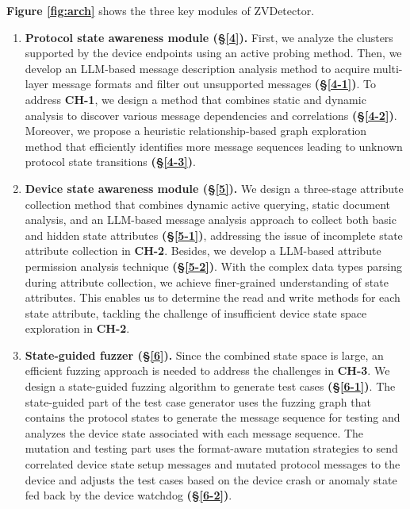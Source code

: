\documentclass[10pt,journal,compsoc]{IEEEtran}
\begin{document}
\textbf{Figure \ref{fig:arch}} shows the three key modules of ZVDetector. \vspace{0cm}
\begin{enumerate}[$\bullet$]
    \setlength{\itemsep}{3pt}
    \setlength{\topsep}{1pt}
    \item \textbf{Protocol state awareness module (\S\ref{4}).} First, we analyze the clusters supported by the device endpoints using an active probing method. Then, we develop an LLM-based message description analysis method to acquire multi-layer message formats and filter out unsupported messages \textbf{(\S\ref{4-1})}. To address \textbf{CH-1}, we design a method that combines static and dynamic analysis to discover various message dependencies and correlations \textbf{(\S\ref{4-2})}. Moreover, we propose a heuristic relationship-based graph exploration method that efficiently identifies more message sequences leading to unknown protocol state transitions \textbf{(\S\ref{4-3})}.
    
    \item \textbf{Device state awareness module (\S\ref{5}).} We design a three-stage attribute collection method that combines dynamic active querying, static document analysis, and an LLM-based message analysis approach to collect both basic and hidden state attributes \textbf{(\S\ref{5-1})}, addressing the issue of incomplete state attribute collection in \textbf{CH-2}. Besides, we develop a LLM-based attribute permission analysis technique \textbf{(\S\ref{5-2})}. With the complex data types parsing during attribute collection, we achieve finer-grained understanding of state attributes. This enables us to determine the read and write methods for each state attribute, tackling the challenge of insufficient device state space exploration in \textbf{CH-2}.

    \item \textbf{State-guided fuzzer (\S\ref{6}).} Since the combined state space is large, an efficient fuzzing approach is needed to address the challenges in \textbf{CH-3}. We design a state-guided fuzzing algorithm to generate test cases \textbf{(\S\ref{6-1})}. The state-guided part of the test case generator uses the fuzzing graph that contains the protocol states to generate the message sequence for testing and analyzes the device state associated with each message sequence. The mutation and testing part uses the format-aware mutation strategies to send correlated device state setup messages and mutated protocol messages to the device and adjusts the test cases based on the device crash or anomaly state fed back by the device watchdog \textbf{(\S\ref{6-2})}.

\end{enumerate}
\end{document}
